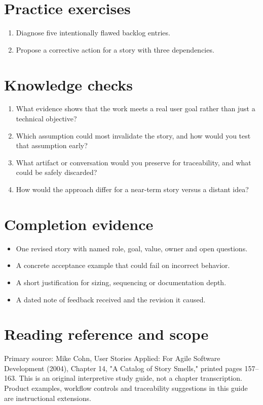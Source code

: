 \documentclass[11pt,letterpaper]{article}
\begin{document}
\section{Practice exercises}
\begin{enumerate}[leftmargin=*,itemsep=3pt]
\item Diagnose five intentionally flawed backlog entries.
\item Propose a corrective action for a story with three dependencies.
\end{enumerate}
\section{Knowledge checks}
\begin{enumerate}[leftmargin=*,itemsep=3pt]
\item What evidence shows that the work meets a real user goal rather than just a technical objective?
\item Which assumption could most invalidate the story, and how would you test that assumption early?
\item What artifact or conversation would you preserve for traceability, and what could be safely discarded?
\item How would the approach differ for a near-term story versus a distant idea?
\end{enumerate}
\section{Completion evidence}
\begin{itemize}[leftmargin=*,itemsep=2pt]
\item One revised story with named role, goal, value, owner and open questions.
\item A concrete acceptance example that could fail on incorrect behavior.
\item A short justification for sizing, sequencing or documentation depth.
\item A dated note of feedback received and the revision it caused.
\end{itemize}
\section{Reading reference and scope}
Primary source: Mike Cohn, User Stories Applied: For Agile Software Development (2004), Chapter 14, "A Catalog of Story Smells," printed pages 157–163. This is an original interpretive study guide, not a chapter transcription. Product examples, workflow controls and traceability suggestions in this guide are instructional extensions.
\end{document}
